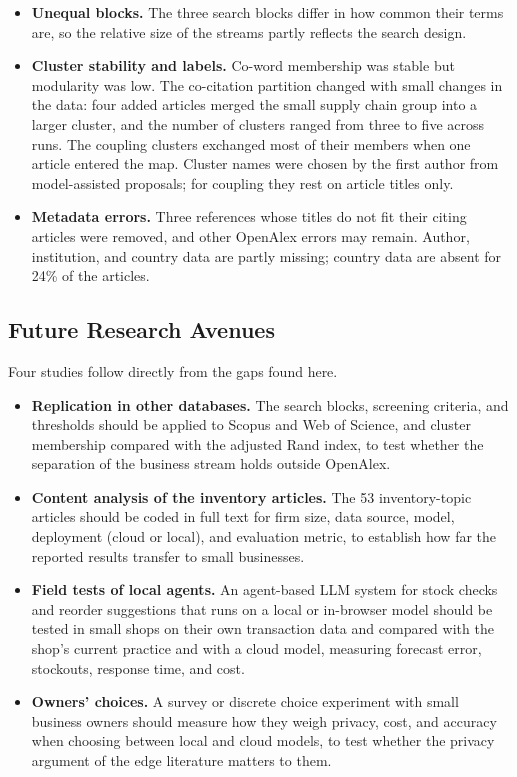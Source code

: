\begin{itemize}
  \item \textbf{Unequal blocks.} The three search blocks differ in how common their terms are, so the relative size of the streams partly reflects the search design.
  \item \textbf{Cluster stability and labels.} Co-word membership was stable but modularity was low. The co-citation partition changed with small changes in the data: four added articles merged the small supply chain group into a larger cluster, and the number of clusters ranged from three to five across runs. The coupling clusters exchanged most of their members when one article entered the map. Cluster names were chosen by the first author from model-assisted proposals; for coupling they rest on article titles only.
  \item \textbf{Metadata errors.} Three references whose titles do not fit their citing articles were removed, and other OpenAlex errors may remain. Author, institution, and country data are partly missing; country data are absent for 24\% of the articles.
\end{itemize}

\subsection{Future Research Avenues}
Four studies follow directly from the gaps found here.
\begin{itemize}
  \item \textbf{Replication in other databases.} The search blocks, screening criteria, and thresholds should be applied to Scopus and Web of Science, and cluster membership compared with the adjusted Rand index, to test whether the separation of the business stream holds outside OpenAlex.
  \item \textbf{Content analysis of the inventory articles.} The 53 inventory-topic articles should be coded in full text for firm size, data source, model, deployment (cloud or local), and evaluation metric, to establish how far the reported results transfer to small businesses.
  \item \textbf{Field tests of local agents.} An agent-based LLM system for stock checks and reorder suggestions that runs on a local or in-browser model should be tested in small shops on their own transaction data and compared with the shop's current practice and with a cloud model, measuring forecast error, stockouts, response time, and cost.
  \item \textbf{Owners' choices.} A survey or discrete choice experiment with small business owners should measure how they weigh privacy, cost, and accuracy when choosing between local and cloud models, to test whether the privacy argument of the edge literature matters to them.
\end{itemize}

